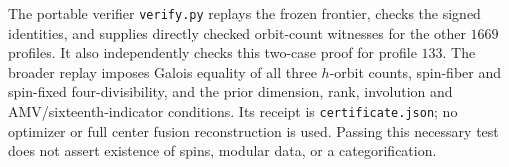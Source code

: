 The portable verifier \texttt{verify.py} replays the frozen frontier,
checks the signed identities, and supplies directly checked orbit-count
witnesses for the other $1669$ profiles.  It also independently checks
this two-case proof for profile $133$.  The broader replay imposes
Galois equality of all three $h$-orbit counts, spin-fiber and spin-fixed
four-divisibility, and the prior dimension, rank, involution and
AMV/sixteenth-indicator conditions.  Its receipt is
\texttt{certificate.json}; no optimizer or full center fusion
reconstruction is used.  Passing this necessary test does not assert
existence of spins, modular data, or a categorification.

